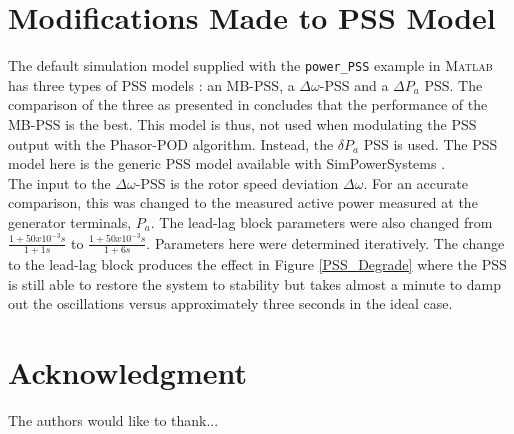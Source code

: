 \documentclass[journal]{IEEEtran}
\begin{document}
\section{Modifications Made to PSS Model}

The default simulation model supplied with the \texttt{power\_PSS} example in \textsc{Matlab} has three types of PSS models \cite{MATLABexample} : an MB-PSS, a $\Delta\omega $-PSS and a $\Delta P_{a}$ PSS. The comparison of the three as presented in \cite{MATLABexample} concludes that the performance of the MB-PSS is the best. This model is thus, not used when modulating the PSS output with the Phasor-POD algorithm. Instead, the $\delta P_{a}$ PSS is used. The PSS model here is the generic PSS model available with SimPowerSystems \cite{PSSDocumentation}.\\

The input to the $\Delta\omega $-PSS is the rotor speed deviation $\Delta\omega $. For an accurate comparison, this was changed to the measured active power measured at the generator terminals, $P_{a}$. The lead-lag block parameters were also changed from $\frac{1 + 50x10^{-3}s}{1 + 1s}$ to $\frac{1 + 50x10^{-3}s}{1 + 6s}$. Parameters here were determined iteratively. The change to the lead-lag block produces the effect in Figure \ref{PSS_Degrade} where the PSS is still able to restore the system to stability but takes almost a minute to damp out the oscillations versus approximately three seconds in the ideal case.\\



\section*{Acknowledgment}


The authors would like to thank...


\ifCLASSOPTIONcaptionsoff
  \newpage
\fi



\end{document}
